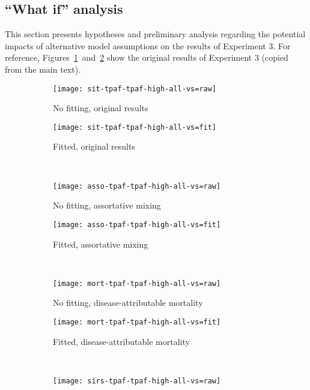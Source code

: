 \subsection{``What if'' analysis}\label{aa:what-if}
This section presents hypotheses and preliminary analysis regarding the potential impacts of
alternative model assumptions on the results of Experiment 3.
For reference, Figures~\ref{fig:tpaf-raw-app}~and~\ref{fig:tpaf-fit-app}
show the original results of Experiment 3 (copied from the main text).
\begin{figure}[!tbp]
  \centering
  \begin{subfigure}{0.35\linewidth}
    \centering\texttt{[image: sit-tpaf-tpaf-high-all-vs=raw]}
    \caption{No fitting, original results}
    \label{fig:tpaf-raw-app}
  \end{subfigure}
  \begin{subfigure}{0.35\linewidth}
    \centering\texttt{[image: sit-tpaf-tpaf-high-all-vs=fit]}
    \caption{Fitted, original results}
    \label{fig:tpaf-fit-app}
  \end{subfigure}\\
  \begin{subfigure}{0.35\linewidth}
    \centering\texttt{[image: asso-tpaf-tpaf-high-all-vs=raw]}
    \caption{No fitting, assortative mixing}
    \label{fig:tpaf-asso-raw}
  \end{subfigure}
  \begin{subfigure}{0.35\linewidth}
    \centering\texttt{[image: asso-tpaf-tpaf-high-all-vs=fit]}
    \caption{Fitted, assortative mixing}
    \label{fig:tpaf-asso-fit}
  \end{subfigure}\\
  \begin{subfigure}{0.35\linewidth}
    \centering\texttt{[image: mort-tpaf-tpaf-high-all-vs=raw]}
    \caption{No fitting, disease-attributable mortality}
    \label{fig:tpaf-mort-raw}
  \end{subfigure}
  \begin{subfigure}{0.35\linewidth}
    \centering\texttt{[image: mort-tpaf-tpaf-high-all-vs=fit]}
    \caption{Fitted, disease-attributable mortality}
    \label{fig:tpaf-mort-fit}
  \end{subfigure}\\
  \begin{subfigure}{0.35\linewidth}
    \centering\texttt{[image: sirs-tpaf-tpaf-high-all-vs=raw]}

\end{subfigure}
\end{figure}
